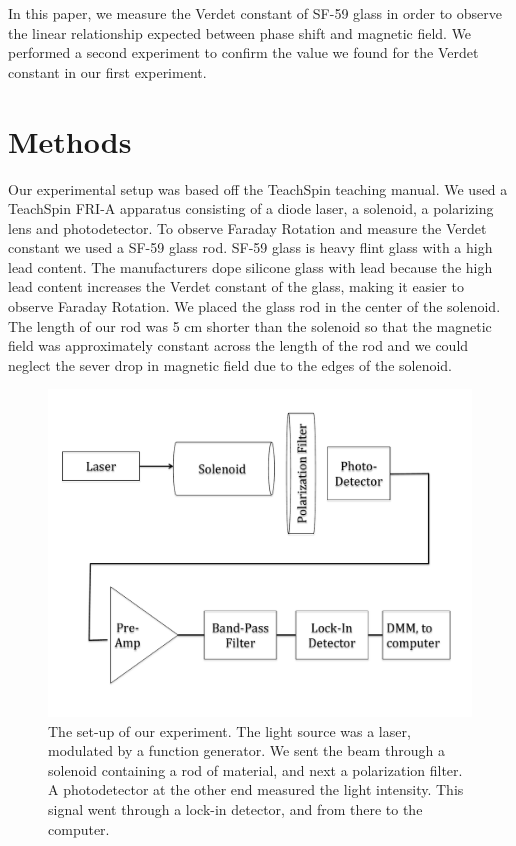 \documentclass[prb,preprint]{revtex4-1}
\begin{document}
In this paper, we measure the Verdet constant of SF-59 glass in order to observe the linear relationship expected between phase shift and magnetic field. We performed a second experiment to confirm the value we found for the Verdet constant in our first experiment.

\section{Methods}

Our experimental setup was based off the TeachSpin teaching manual. We used a TeachSpin FRI-A apparatus consisting of a diode laser, a solenoid, a polarizing lens and photodetector. To observe Faraday Rotation and measure the Verdet constant we used a SF-59 glass rod. SF-59 glass is heavy flint glass with a high lead content. The manufacturers dope silicone glass with lead  because the high lead content increases the Verdet constant of the glass, making it easier to observe Faraday Rotation.\cite{opticalglass} We placed the glass rod in the center of the solenoid. The length of our rod was 5 cm shorter than the solenoid so that the magnetic field was approximately constant across the length of the rod and we could neglect the sever drop in magnetic field due to the edges of the solenoid.

\begin{figure}[h!]
\centering
\includegraphics[width=6in]{Faraday_lab_set-up.pdf}
\caption{The set-up of our experiment. The light source was a laser, modulated by a function generator. We sent the beam through a solenoid containing a rod of material, and next a polarization filter. A photodetector at the other end measured the light intensity. This signal went through a  lock-in detector, and from there to the computer.}
\label{set-up}
\end{figure}
\end{document}
